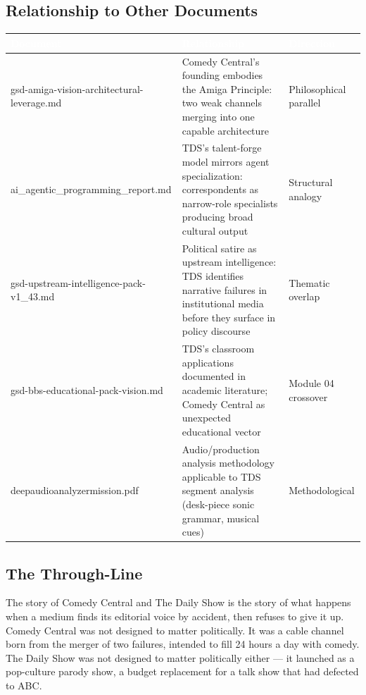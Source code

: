 \documentclass[11pt,letterpaper]{article}
\newcommand{\tableheader}[1]{\textbf{\sffamily\textcolor{white}{#1}}}
\begin{document}
\subsection{Relationship to Other Documents}

\begin{center}
\begin{tabularx}{\textwidth}{L{5cm}XC{2.5cm}}
\toprule
{}
\tableheader{Document} & \tableheader{Relationship} & \tableheader{Direction} \\
\midrule
gsd-amiga-vision-architectural-leverage.md & Comedy Central's founding embodies the Amiga Principle: two weak channels merging into one capable architecture & Philosophical parallel \\
ai\_agentic\_programming\_report.md & TDS's talent-forge model mirrors agent specialization: correspondents as narrow-role specialists producing broad cultural output & Structural analogy \\
gsd-upstream-intelligence-pack-v1\_43.md & Political satire as upstream intelligence: TDS identifies narrative failures in institutional media before they surface in policy discourse & Thematic overlap \\
gsd-bbs-educational-pack-vision.md & TDS's classroom applications documented in academic literature; Comedy Central as unexpected educational vector & Module 04 crossover \\
deepaudioanalyzermission.pdf & Audio/production analysis methodology applicable to TDS segment analysis (desk-piece sonic grammar, musical cues) & Methodological \\
\bottomrule
\end{tabularx}
\end{center}

\subsection{The Through-Line}

The story of Comedy Central and The Daily Show is the story of what happens when a medium finds its editorial voice by accident, then refuses to give it up. Comedy Central was not designed to matter politically. It was a cable channel born from the merger of two failures, intended to fill 24 hours a day with comedy. The Daily Show was not designed to matter politically either --- it launched as a pop-culture parody show, a budget replacement for a talk show that had defected to ABC.
\end{document}
